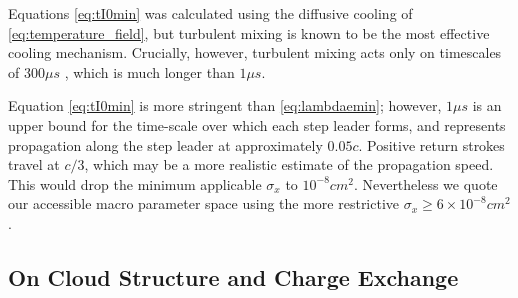 \documentclass[%
 reprint,
 amsmath,amssymb,
 aps,
]{revtex4-2}
\newcommand{\vtwo}[1]{{\color{red} #1}}
\begin{document}
        \vtwo{Equations \eqref{eq:tI0min} was calculated using the diffusive cooling of \eqref{eq:temperature_field}, but turbulent mixing is known to be the most effective cooling mechanism. Crucially, however, turbulent mixing acts only on timescales of $300\mu{s}$ \vtwo{\citep{Picone1983}}, which is much longer than $1\mu{s}$.}

        \vtwo{Equation \eqref{eq:tI0min} is more stringent than \eqref{eq:lambdaemin}; however, $1\mu{s}$ is an upper bound for the time-scale over which each step leader forms, and represents propagation along the step leader at approximately $0.05c$.} Positive return strokes travel \vtwo{\citep{Idone1987}} at $c/3$, which may be a more realistic estimate of the propagation speed. This would drop the minimum applicable $\sigma_x$ to $10^{-8}cm^2$. Nevertheless we quote our accessible macro parameter space using the more restrictive $\sigma_x \geq 6\times 10^{-8}cm^2$.


    \subsection{On Cloud Structure and Charge Exchange}
\end{document}
